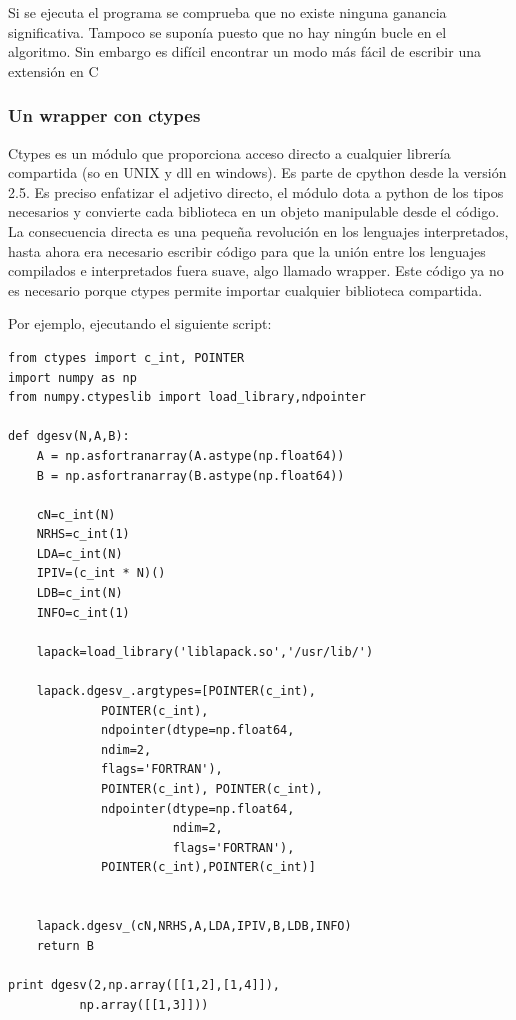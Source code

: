\documentclass[10pt,letterpaper,conference]{ieeeconfspanish}
\begin{document}
Si se ejecuta el programa se comprueba que no existe ninguna ganancia
significativa.  Tampoco se suponía puesto que no hay ningún bucle en
el algoritmo.  Sin embargo es difícil encontrar un modo más fácil de
escribir una extensión en C

\subsubsection*{Un wrapper con ctypes}
Ctypes es un módulo que proporciona acceso directo a cualquier
librería compartida (so en UNIX y dll en windows). Es parte de cpython
desde la versión 2.5. Es preciso enfatizar el adjetivo directo, el
módulo dota a python de los tipos necesarios y convierte cada
biblioteca en un objeto manipulable desde el código. La consecuencia
directa es una pequeña revolución en los lenguajes interpretados,
hasta ahora era necesario escribir código para que la unión entre los
lenguajes compilados e interpretados fuera suave, algo llamado
wrapper. Este código ya no es necesario porque ctypes permite importar
cualquier biblioteca compartida.

Por ejemplo, ejecutando el siguiente script:

\begin{footnotesize}
\begin{verbatim}
from ctypes import c_int, POINTER
import numpy as np
from numpy.ctypeslib import load_library,ndpointer

def dgesv(N,A,B):
    A = np.asfortranarray(A.astype(np.float64))
    B = np.asfortranarray(B.astype(np.float64))

    cN=c_int(N)
    NRHS=c_int(1)
    LDA=c_int(N)
    IPIV=(c_int * N)()
    LDB=c_int(N)
    INFO=c_int(1)

    lapack=load_library('liblapack.so','/usr/lib/')

    lapack.dgesv_.argtypes=[POINTER(c_int),
             POINTER(c_int),
             ndpointer(dtype=np.float64,
             ndim=2,
             flags='FORTRAN'),
             POINTER(c_int), POINTER(c_int),
             ndpointer(dtype=np.float64,
                       ndim=2,
                       flags='FORTRAN'),
             POINTER(c_int),POINTER(c_int)]


    lapack.dgesv_(cN,NRHS,A,LDA,IPIV,B,LDB,INFO)
    return B

print dgesv(2,np.array([[1,2],[1,4]]),
          np.array([[1,3]]))
\end{verbatim}
\end{footnotesize}
\end{document}
